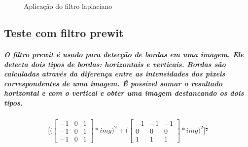 \documentclass[12pt,fleqn]{article}
\begin{document}
  \begin{figure}[!htb]
  \centering
  \caption{Aplicação do filtro laplaciano}
  \label{fig:Resultado 1}
  \end{figure}

  \newpage

  \subsection{Teste com filtro prewit}

  \subparagraph{\normalfont O filtro prewit é usado para detecção de bordas em uma imagem. Ele detecta dois tipos de bordas: horizontais e verticais. Bordas são calculadas
  através da diferença entre as intensidades dos pixels correspondentes de uma imagem. É possível somar o resultado horizontal e com o vertical e obter uma imagem destancando os dois tipos. }

  \begin{equation*}
    
    \Bigg[
      \Bigg(\begin{bmatrix}
        -1 & 0 & 1 \\
        -1 & 0 & 1 \\
        -1 & 0 & 1 
      \end{bmatrix}
      * img\Bigg)^2
    +
    
    \Bigg(\begin{bmatrix}
        -1 & -1 & -1 \\
        0 & 0 & 0 \\
        1 & 1 & 1 
    \end{bmatrix}
    * img\Bigg)^2

    \Bigg]^\frac{1}{2}
  \end{equation*}
\end{document}
